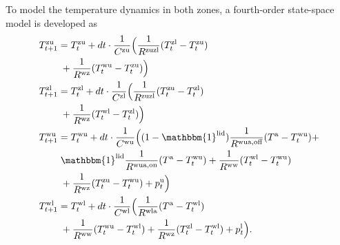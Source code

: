 \documentclass[conference]{IEEEtran}
\begin{document}
To model the temperature dynamics in both zones, a fourth-order state-space model is developed as
%
\begingroup
\allowdisplaybreaks
\begin{subequations}\label{eq:StateSpaceModel}
    \begin{align}
        T^{\text{zu}}_{t+1} & = T^{\text{zu}}_{t} + dt \cdot \frac{1}{C^{\text{zu}}}\Bigl( \frac{1}{R^{\text{zuzl}}} (T^{\text{zl}}_{t} - T^{\text{zu}}_{t}) \notag                                     \\ & \mspace{5mu} + \frac{1}{R^{\text{wz}}} (T^{\text{wu}}_{t} - T^{\text{zu}}_{t}) \Bigr) \label{eq1:StateSpaceModel} \\
        T^{\text{zl}}_{t+1} & = T^{\text{zl}}_{t} + dt \cdot \frac{1}{C^{\text{zl}}}\Bigl( \frac{1}{R^{\text{zuzl}}} (T^{\text{zu}}_{t} - T^{\text{zl}}_{t}) \notag                                     \\ & \mspace{5mu} + \frac{1}{R^{\text{wz}}} (T^{\text{wl}}_{t} - T^{\text{zl}}_{t}) \Bigr) \label{eq2:StateSpaceModel} \\
        T^{\text{wu}}_{t+1} & = T^{\text{wu}}_{t} + dt \cdot \frac{1}{C^{\text{wu}}}\Bigl( (1-\mathbbm{1}^{\text{lid}}) \frac{1}{R^{\text{wua},\text{off}}} (T^{\text{a}} - T^{\text{wu}}_{t}) \notag + \\ & \mspace{5mu} \mathbbm{1}^{\text{lid}} \frac{1}{R^{\text{wua},\text{on}}} (T^{\text{a}} - T^{\text{wu}}_{t}) + \frac{1}{R^{\text{ww}}} (T^{\text{wl}}_{t} - T^{\text{wu}}_{t}) \notag \\ & \mspace{5mu} + \frac{1}{R^{\text{wz}}} (T^{\text{zu}}_{t} - T^{\text{wu}}_{t}) + p^{\text{u}}_{t} \Bigr) \label{eq3:StateSpaceModel} \\
        T^{\text{wl}}_{t+1} & = T^{\text{wl}}_{t} + dt \cdot \frac{1}{C^{\text{wl}}}\Bigl( \frac{1}{R^{\text{wla}}} (T^{\text{a}} - T^{\text{wl}}_{t}) \notag                                           \\ & \mspace{5mu} + \frac{1}{R^{\text{ww}}} (T^{\text{wu}}_{t} - T^{\text{wl}}_{t}) + \frac{1}{R^{\text{wz}}} (T^{\text{zl}}_{t} - T^{\text{wl}}_{t}) + p^{\text{l}}_{t} \Bigr). \label{eq4:StateSpaceModel}
    \end{align}
\end{subequations}
\endgroup
\end{document}
